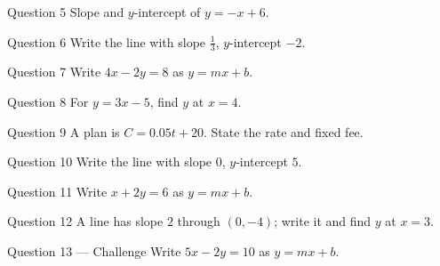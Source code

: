 \documentclass[11pt]{article}
\begin{document}
\begin{qbox}{Question 5}
Slope and $y$-intercept of $y=-x+6$.\workspace{1.8cm}
\end{qbox}

\begin{qbox}{Question 6}
Write the line with slope $\tfrac13$, $y$-intercept $-2$.\workspace{1.8cm}
\end{qbox}

\begin{qbox}{Question 7}
Write $4x-2y=8$ as $y=mx+b$.\workspace{2.0cm}
\end{qbox}

\begin{qbox}{Question 8}
For $y=3x-5$, find $y$ at $x=4$.\workspace{2.0cm}
\end{qbox}

\begin{qbox}{Question 9}
A plan is $C=0.05t+20$. State the rate and fixed fee.\workspace{2.0cm}
\end{qbox}

\begin{qbox}{Question 10}
Write the line with slope $0$, $y$-intercept $5$.\workspace{1.8cm}
\end{qbox}

\begin{qbox}{Question 11}
Write $x+2y=6$ as $y=mx+b$.\workspace{2.0cm}
\end{qbox}

\begin{qbox}{Question 12}
A line has slope $2$ through $(0,-4)$; write it and find $y$ at $x=3$.\workspace{2.4cm}
\end{qbox}

\begin{qbox}{Question 13 --- Challenge}
Write $5x-2y=10$ as $y=mx+b$.\workspace{2.2cm}
\end{qbox}

\clearpage
{}
\end{document}
